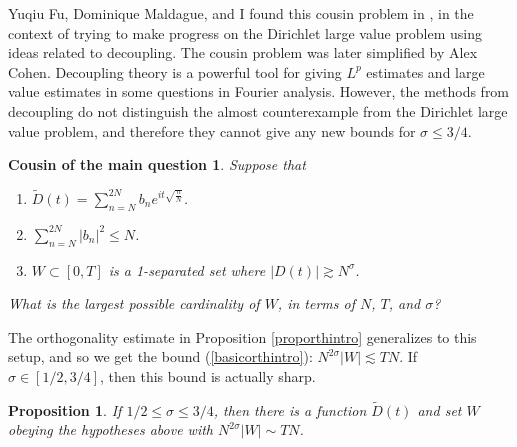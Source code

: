\documentclass{amsart}
\newtheorem{prop}{Proposition}[section]
\begin{document}
Yuqiu Fu, Dominique Maldague, and I found this cousin problem in \cite{FGM},  in the context of trying to make progress on the Dirichlet large value problem using ideas related to decoupling.  The cousin problem was later simplified by Alex Cohen.  Decoupling theory is a powerful tool for giving $L^p$ estimates and large value estimates in some questions in Fourier analysis.  However, the methods from decoupling do not distinguish the almost counterexample from the Dirichlet large value problem, and therefore they cannot give any new bounds for $\sigma \le 3/4$. 


\newtheorem*{setupac}{Cousin of the main question}

\begin{setupac} Suppose that

\begin{enumerate}

\item $\tilde D(t) = \sum_{n=N}^{2N} b_n e^{i t \sqrt{\frac{n}{N}}}$.  

\item $\sum_{n=N}^{2N} |b_n|^2 \le N$.

\item $W \subset [0,T]$ is a 1-separated set where $|D(t)| \gtrsim N^\sigma$.

\end{enumerate}

What is the largest possible cardinality of $W$, in terms of $N$, $T$, and $\sigma$?

\end{setupac}

The orthogonality estimate in Proposition \ref{proporthintro} generalizes to this setup, and so we get the bound (\ref{basicorthintro}): $N^{2 \sigma} |W| \lesssim T N$.   If $\sigma \in [1/2, 3/4]$, then this bound is actually sharp.

\begin{prop} \label{propac} If $1/2 \le \sigma \le 3/4$, then there is a function $\tilde D(t)$ and set $W$ obeying the hypotheses above with $N^{2 \sigma} |W| \sim T N$.
\end{prop}
\end{document}
